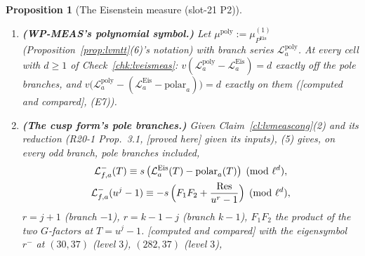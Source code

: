 \documentclass[11pt]{article}
\newtheorem{proposition}[theorem]{Proposition}
\theoremstyle{remark}
\newcommand{\PROVED}{\textsf{[proved here]}}
\newcommand{\STD}{\textsf{[standard, reference]}}
\newcommand{\CMPD}{\textsf{[computed and compared]}}   %
\newcommand{\Ucite}[1]{[U,~\texttt{#1}]}               %
\begin{document}
\begin{proposition}[The Eisenstein measure (slot-21 P2)]
\begin{enumerate}
\begin{gather*}
  \end{gather*}
  the same residue on both, $\mathrm{Res}=-\rho_\infty\,G_k(x_k)$ with $\rho_\infty:=(1-\ell)\log_\ell(u)/\ell$ ($\zeta_\ell$'s residue in the variable $u^{s}-1$, \STD{} recalled) and
  $G_k(x_k)=-(1-\ell^{k-1})B_k/k$ (\Ucite{lem:u-twistvalues}); so $v(\mathrm{Res})=d$. The shape is \PROVED{} for the branch $-1$ up to the constant (elementary, from $E_1$'s ball values);
  the constant was \CMPD{} (calibrated at $(12,5)$, level~$4$, and $(14,7)$, level~$3$; then predicted at the other cells) and is \PROVED{} given (3) and $\zeta_\ell$'s residue (F4m,
  v1.21.0-pre.4): $T\,G_0(T)\in\Lambda$ with $(TG_0)(0)=\rho_\infty$, so $G_0(T)=\rho_\infty/T+(\Lambda)$; with $X:=u(1+T)-1$ and $Y:=u^{k-1}(1+T)^{-1}-1$ one has $Y-x_k=-u^{k-1}(1+T)^{-1}X$,
  so $G_k(Y)\equiv G_k(x_k)\pmod{X\Lambda}$ and $-G_0(X)\,G_k(Y)=-\rho_\infty G_k(x_k)/X+(\Lambda)$; on the branch $k-1$ the same with the two factors exchanged (the pole at $Y=0$, where $X=x_k$). At level $M$ the polar part is
  $(1-\ell)(1-\ell^{k-1})(B_k/k)\ell^{-M}N_u$, $N_u=\sum_{i<\ell^{M-1}}u^{i}[\gamma^{i}]$ (branch $-1$; on the branch $k-1$, $\sum_iu^{-(k-1)i}[\gamma^{i}]$ with an extra $1/(k-1)$); \CMPD: the branch
  element has valuation exactly $d-M$ when $d<M$, and minus the polar part it is integral.
\item \textbf{(WP-MEAS's polynomial symbol.)} Let $\mu^{\mathrm{poly}}:=\mu^{(1)}_{P^{\mathrm{Eis}}}$ (Proposition~\ref{prop:lvmtt}(6)'s notation) with branch series $\mathcal L^{\mathrm{poly}}_a$. At every cell with
  $d\ge1$ of Check~\ref{chk:lveismeas}: $v(\mathcal L^{\mathrm{poly}}_a-\mathcal L^{\mathrm{Eis}}_a)=d$ exactly off the pole branches, and
  $v\bigl(\mathcal L^{\mathrm{poly}}_a-(\mathcal L^{\mathrm{Eis}}_a-\mathrm{polar}_a)\bigr)=d$ exactly on them (\CMPD, (E7)).
\item \textbf{(The cusp form's pole branches.)} Given Claim~\ref{cl:lvmeascong}(2) and its reduction (R20-1 Prop.~3.1, \PROVED{} given its inputs), (5) gives, on every odd branch, pole branches
  included,
  \begin{gather*}
    \mathcal L^{-}_{f,a}(T)\equiv s\,\bigl(\mathcal L^{\mathrm{Eis}}_a(T)-\mathrm{polar}_a(T)\bigr)\pmod{\ell^{d}},\\
    \mathcal L^{-}_{f,a}(u^{j}-1)\equiv-s\,\Bigl(F_1F_2+\frac{\mathrm{Res}}{u^{r}-1}\Bigr)\pmod{\ell^{d}},
  \end{gather*}
  $r=j+1$ (branch $-1$), $r=k-1-j$ (branch $k-1$), $F_1F_2$ the product of the two $G$-factors at $T=u^{j}-1$. \CMPD{} with the eigensymbol $r^{-}$ at $(30,37)$ (level $3$), $(282,37)$ (level $3$),

\end{enumerate}
\end{proposition}
\end{document}
